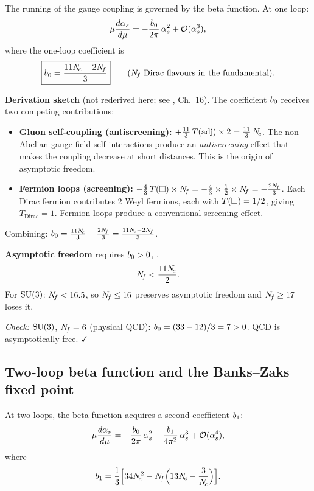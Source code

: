 \documentclass[11pt,a4paper]{article}
\begin{document}
The running of the gauge coupling is governed by the beta function.  At
one loop:
\begin{equation}
  \mu\frac{d\alpha_s}{d\mu}
  = -\frac{b_0}{2\pi}\,\alpha_s^2 + \mathcal{O}(\alpha_s^3),
  \label{eq:beta-1loop}
\end{equation}
where the one-loop coefficient is
\begin{equation}
  \boxed{%
  \bzero = \frac{11\Nc - 2\Nf}{3}
  }
  \qquad (\Nf \text{ Dirac flavours in the fundamental}).
  \label{eq:b0}
\end{equation}

\textbf{Derivation sketch} (not rederived here; see \cite{PS1995}, Ch.~16).
The coefficient $b_0$ receives two competing contributions:
\begin{itemize}
  \item \textbf{Gluon self-coupling (antiscreening):} $+\frac{11}{3}\,T(\mathrm{adj}) \times 2
    = \frac{11}{3}\,N_{\!c}$.
    The non-Abelian gauge field self-interactions produce an
    \emph{antiscreening} effect that makes the coupling decrease at short
    distances.  This is the origin of asymptotic freedom.
  \item \textbf{Fermion loops (screening):} $-\frac{4}{3}\,T(\square) \times N_{\!f}
    = -\frac{4}{3} \times \frac{1}{2} \times N_{\!f} = -\frac{2N_{\!f}}{3}$.
    Each Dirac fermion contributes $2$ Weyl fermions, each with
    $T(\square) = 1/2$, giving $T_{\text{Dirac}} = 1$.
    Fermion loops produce a conventional screening effect.
\end{itemize}

\noindent Combining: $b_0 = \frac{11N_{\!c}}{3} - \frac{2N_{\!f}}{3}
= \frac{11N_{\!c} - 2N_{\!f}}{3}$.

\textbf{Asymptotic freedom} requires $b_0 > 0$, \ie,
\begin{equation}
  N_{\!f} < \frac{11N_{\!c}}{2}.
  \label{eq:af-bound}
\end{equation}
For $\mathrm{SU}(3)$: $N_{\!f} < 16.5$, so $N_{\!f} \leq 16$ preserves asymptotic freedom
and $N_{\!f} \geq 17$ loses it.

\textit{Check:} $\mathrm{SU}(3)$, $N_{\!f} = 6$ (physical QCD): $b_0 = (33 - 12)/3 = 7 > 0$.
QCD is asymptotically free.  $\checkmark$

\subsection{Two-loop beta function and the Banks--Zaks fixed point}

At two loops, the beta function acquires a second coefficient $b_1$:
\begin{equation}
  \mu\frac{d\alpha_s}{d\mu}
  = -\frac{b_0}{2\pi}\,\alpha_s^2
  - \frac{b_1}{4\pi^2}\,\alpha_s^3
  + \mathcal{O}(\alpha_s^4),
  \label{eq:beta-2loop}
\end{equation}
where
\begin{equation}
  b_1 = \frac{1}{3}\Bigl[34N_{\!c}^2 - N_{\!f}\Bigl(13N_{\!c} - \frac{3}{N_{\!c}}\Bigr)\Bigr].
  \label{eq:b1}
\end{equation}
\end{document}
